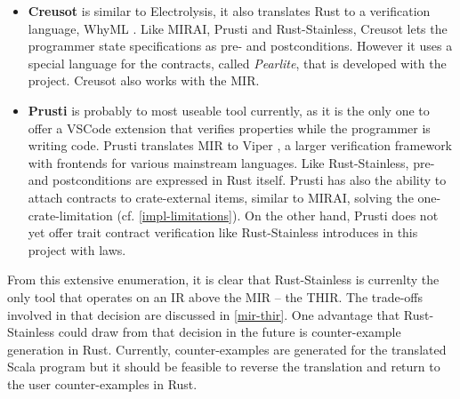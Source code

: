 \begin{itemize}
\item \textbf{Creusot} \cite{creusot} is similar to Electrolysis, it also
translates Rust to a verification language, WhyML \cite{why3}. Like MIRAI,
Prusti and Rust-Stainless, Creusot lets  the programmer state specifications as
pre- and postconditions. However it uses a special language for the contracts,
called \emph{Pearlite}, that is developed with the project. Creusot also works
with the MIR.

\item \textbf{Prusti} \cite{prusti} is probably to most useable tool currently,
as it is the only one  to offer a VSCode extension that verifies properties
while the programmer is writing code. Prusti translates MIR to Viper
\cite{viper}, a larger verification framework with frontends for various
mainstream languages. Like Rust-Stainless, pre- and postconditions are expressed
in Rust itself. Prusti has also the ability to attach contracts to
crate-external items, similar to MIRAI, solving the one-crate-limitation (cf.
\autoref{impl-limitations}). On the other hand, Prusti does not yet offer trait
contract verification like Rust-Stainless introduces in this project with laws.

\end{itemize}

\hfill \break \noindent  From this extensive enumeration, it is clear that
Rust-Stainless is currenlty the only tool that operates on an IR above the MIR
-- the THIR. The trade-offs involved in that decision are discussed in
\autoref{mir-thir}. One advantage that Rust-Stainless could draw from that
decision in the future is counter-example generation in Rust. Currently,
counter-examples are generated for the translated Scala program but it should be
feasible to reverse the translation and return to the user counter-examples in
Rust.
